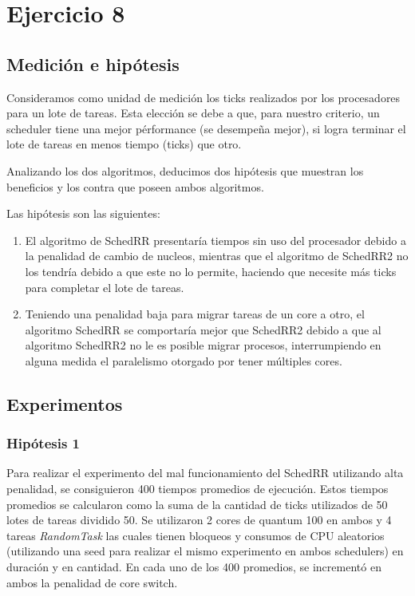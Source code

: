 \documentclass[a4paper,10pt,twoside]{article}
\begin{document}


\section{Ejercicio 8}

\subsection{Medición e hipótesis}
Consideramos como unidad de medición los ticks realizados por los procesadores para un lote de tareas. Esta elección se debe a que, para nuestro criterio, un scheduler tiene una mejor pérformance (se desempeña mejor), si logra terminar el lote de tareas en menos tiempo (ticks) que otro.

Analizando los dos algoritmos, deducimos dos hipótesis que muestran los beneficios y los contra que poseen ambos algoritmos.

Las hipótesis son las siguientes:
\begin{enumerate}
\item El algoritmo de SchedRR presentaría tiempos sin uso del procesador debido a la penalidad de cambio de nucleos, mientras que el algoritmo de SchedRR2 no los tendría debido a que este no lo permite, haciendo que necesite más ticks para completar el lote de tareas.

\item Teniendo una penalidad baja para migrar tareas de un core a otro,  el algoritmo SchedRR se comportaría mejor que SchedRR2 debido a que al algoritmo SchedRR2 no le es posible migrar procesos, interrumpiendo en alguna medida el paralelismo otorgado por tener múltiples cores.
\end{enumerate}

\subsection{Experimentos}
\subsubsection{Hipótesis 1}

Para realizar el experimento del mal funcionamiento del SchedRR utilizando alta penalidad, se consiguieron 400 tiempos promedios de ejecución. Estos tiempos promedios se calcularon como la suma de la cantidad de ticks utilizados de 50 lotes de tareas dividido 50. Se utilizaron 2 cores de quantum 100 en ambos y 4 tareas \textit{RandomTask} las cuales tienen bloqueos y consumos de CPU aleatorios (utilizando una seed para realizar el mismo experimento en ambos schedulers) en duración y en cantidad. En cada uno de los 400 promedios, se incrementó en ambos la penalidad de core switch.
\end{document}
